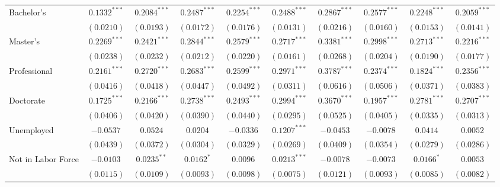 \begin{table}
\begin{center}
\begin{tabular}{l c c c c c c c c c}
Bachelor's                     & $0.1332^{***}$  & $0.2084^{***}$  & $0.2487^{***}$  & $0.2254^{***}$  & $0.2488^{***}$  & $0.2867^{***}$  & $0.2577^{***}$  & $0.2248^{***}$  & $0.2059^{***}$  \\
                               & $(0.0210)$      & $(0.0193)$      & $(0.0172)$      & $(0.0176)$      & $(0.0131)$      & $(0.0216)$      & $(0.0160)$      & $(0.0153)$      & $(0.0141)$      \\
Master's                       & $0.2269^{***}$  & $0.2421^{***}$  & $0.2844^{***}$  & $0.2579^{***}$  & $0.2717^{***}$  & $0.3381^{***}$  & $0.2998^{***}$  & $0.2713^{***}$  & $0.2216^{***}$  \\
                               & $(0.0238)$      & $(0.0232)$      & $(0.0212)$      & $(0.0220)$      & $(0.0161)$      & $(0.0268)$      & $(0.0204)$      & $(0.0190)$      & $(0.0177)$      \\
Professional                   & $0.2161^{***}$  & $0.2720^{***}$  & $0.2683^{***}$  & $0.2599^{***}$  & $0.2971^{***}$  & $0.3787^{***}$  & $0.2374^{***}$  & $0.1824^{***}$  & $0.2356^{***}$  \\
                               & $(0.0416)$      & $(0.0418)$      & $(0.0447)$      & $(0.0492)$      & $(0.0311)$      & $(0.0616)$      & $(0.0506)$      & $(0.0371)$      & $(0.0383)$      \\
Doctorate                      & $0.1725^{***}$  & $0.2166^{***}$  & $0.2738^{***}$  & $0.2493^{***}$  & $0.2994^{***}$  & $0.3670^{***}$  & $0.1957^{***}$  & $0.2781^{***}$  & $0.2707^{***}$  \\
                               & $(0.0406)$      & $(0.0420)$      & $(0.0390)$      & $(0.0440)$      & $(0.0295)$      & $(0.0525)$      & $(0.0405)$      & $(0.0335)$      & $(0.0313)$      \\
Unemployed                     & $-0.0537$       & $0.0524$        & $0.0204$        & $-0.0336$       & $0.1207^{***}$  & $-0.0453$       & $-0.0078$       & $0.0414$        & $0.0052$        \\
                               & $(0.0439)$      & $(0.0372)$      & $(0.0304)$      & $(0.0329)$      & $(0.0269)$      & $(0.0409)$      & $(0.0354)$      & $(0.0279)$      & $(0.0286)$      \\
Not in Labor Force             & $-0.0103$       & $0.0235^{**}$   & $0.0162^{*}$    & $0.0096$        & $0.0213^{***}$  & $-0.0078$       & $-0.0073$       & $0.0166^{*}$    & $0.0053$        \\
                               & $(0.0115)$      & $(0.0109)$      & $(0.0093)$      & $(0.0098)$      & $(0.0075)$      & $(0.0121)$      & $(0.0093)$      & $(0.0085)$      & $(0.0082)$      \\

\end{tabular}
\end{center}
\end{table}
